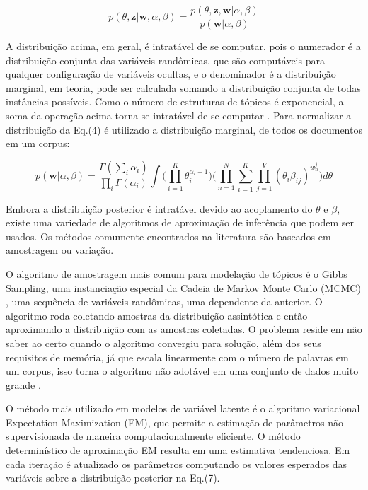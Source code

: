 \documentclass[12pt,a4paper]{article}
\begin{document}
\begin{equation}
p(\theta,\textbf{z}|\textbf{w},\alpha,\beta) = \frac{p(\theta,\textbf{z},\textbf{w}|\alpha,\beta)}{p(\textbf{w}|\alpha,\beta)}
\end{equation}

A distribuição acima, em geral, é intratável de se computar, pois o numerador é a distribuição conjunta das variáveis randômicas, que são computáveis para qualquer configuração de variáveis ocultas, e
 o denominador é a distribuição marginal, em teoria, pode ser calculada somando a distribuição conjunta de todas instâncias possíveis. Como o número de estruturas de tópicos é exponencial, a soma da operação acima torna-se intratável de se computar \cite{blei2012probabilistic}. Para normalizar a distribuição da Eq.(4) é utilizado a distribuição marginal,
 de todos os documentos em um corpus:

\begin{equation}
p(\textbf{w}|\alpha,\beta)=\frac{\Gamma(\sum_{i}\alpha_i)}{\prod_{i}\Gamma(\alpha_i)}\int{\Bigg(\prod_{i=1}^{K}\theta_i^{\alpha_i-1}\Bigg)} \Bigg(\prod_{n=1}^{N}\sum_{i=1}^{K}\prod_{j=1}^{V}(\theta_i\beta_{ij})^{w_n^j}\Bigg)d\theta
\end{equation}

Embora a distribuição posterior é intratável devido ao acoplamento do $\theta$ e $\beta$, existe uma variedade de algoritmos de aproximação de inferência que podem ser usados. Os métodos comumente encontrados na literatura são baseados em amostragem ou variação.

O algoritmo de amostragem mais comum para modelação de tópicos é o Gibbs Sampling, uma instanciação especial da Cadeia de Markov Monte Carlo (MCMC) \cite{jordan1999introduction},
 uma sequência de variáveis randômicas, uma dependente da anterior. O algoritmo roda coletando amostras da distribuição assintótica e então aproximando a distribuição com as amostras coletadas.
 O problema reside em não saber ao certo  quando o algoritmo convergiu para solução, além dos seus requisitos de memória, já que escala linearmente com o número de palavras em um corpus,
 isso torna o algoritmo não adotável em uma conjunto de dados muito grande \cite{vrehuuvrek2011scalability}.

O método mais utilizado em modelos de variável latente é o algoritmo variacional Expectation-Maximization (EM), que permite a estimação de parâmetros não supervisionada de maneira computacionalmente eficiente. O método determinístico de aproximação EM resulta em uma estimativa tendenciosa. Em cada iteração é atualizado os parâmetros computando os valores esperados das variáveis sobre a distribuição posterior na Eq.(7).
\end{document}
